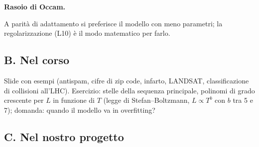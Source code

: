 \documentclass[11pt,a4paper]{article}
\newcommand{\dom}[1]{\par\smallskip\noindent\textbf{#1}\par\nopagebreak}
\begin{document}
\dom{Rasoio di Occam.} A parit\`a di adattamento si preferisce il modello con meno parametri; la regolarizzazione (L10) \`e il modo matematico per farlo.

\subsection*{B. Nel corso}
Slide con esempi (antispam, cifre di zip code, infarto, LANDSAT, classificazione di collisioni all'LHC). Esercizio: stelle della sequenza principale, polinomi di grado crescente per $L$ in funzione di $T$ (legge di Stefan--Boltzmann, $L\propto T^b$ con $b$ tra 5 e 7); domanda: quando il modello va in overfitting?

\subsection*{C. Nel nostro progetto}
\end{document}
